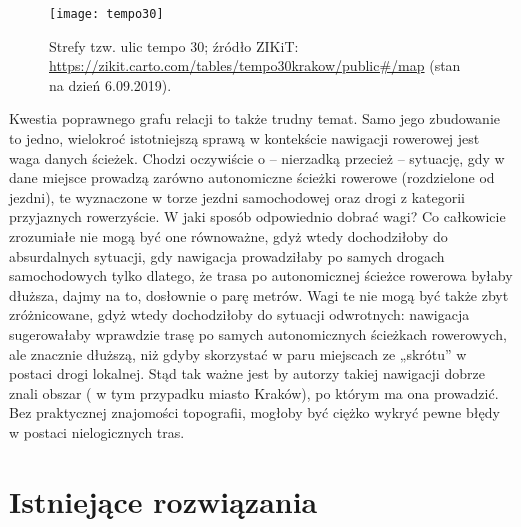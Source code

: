 \begin{figure}[H]
\centering
\texttt{[image: tempo30]}
\caption{Strefy tzw. ulic tempo 30; źródło ZIKiT: \protect\url{https://zikit.carto.com/tables/tempo30krakow/public\#/map} (stan na dzień 6.09.2019).}
\end{figure}

Kwestia poprawnego grafu relacji to także trudny temat. Samo jego zbudowanie to jedno, wielokroć istotniejszą sprawą w kontekście nawigacji rowerowej jest waga danych ścieżek. Chodzi oczywiście o – nierzadką przecież – sytuację, gdy w dane miejsce prowadzą zarówno autonomiczne ścieżki rowerowe (rozdzielone od jezdni), te wyznaczone w torze jezdni samochodowej oraz drogi z kategorii przyjaznych rowerzyście. W jaki sposób odpowiednio dobrać wagi? Co całkowicie zrozumiałe nie mogą być one równoważne, gdyż wtedy dochodziłoby do absurdalnych sytuacji, gdy nawigacja prowadziłaby po samych drogach samochodowych tylko dlatego, że trasa po autonomicznej ścieżce rowerowa byłaby dłuższa, dajmy na to, dosłownie o parę metrów. Wagi te nie mogą być także zbyt zróżnicowane, gdyż wtedy dochodziłoby do sytuacji odwrotnych: nawigacja sugerowałaby wprawdzie trasę po samych autonomicznych ścieżkach rowerowych, ale znacznie dłuższą, niż gdyby skorzystać w paru miejscach ze „skrótu” w postaci drogi lokalnej. Stąd tak ważne jest by autorzy takiej nawigacji dobrze znali obszar ( w tym przypadku miasto Kraków), po którym ma ona prowadzić. Bez praktycznej znajomości topografii, mogłoby być ciężko wykryć pewne błędy w postaci nielogicznych tras.

\section{Istniejące rozwiązania}

